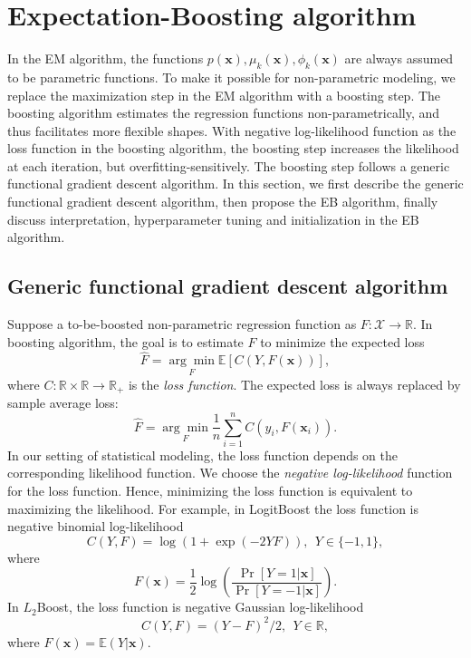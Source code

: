 \documentclass[11pt]{article}
\numberwithin{equation}{section}
\def\R{{\mathbb R}}  %
\def\E{{\mathbb E}}  %
\def\bx{\boldsymbol{x}}
\begin{document}
\section{Expectation-Boosting algorithm}\label{sec:EB}
In the EM algorithm, the functions $p(\bx), \mu_k(\bx), \phi_k(\bx)$ are always assumed to be parametric functions.
To make it possible for non-parametric modeling, we replace the maximization step in the EM algorithm with a boosting step.
The boosting algorithm estimates the regression functions non-parametrically, and thus facilitates more flexible shapes.
With negative log-likelihood function as the loss function in the boosting algorithm, 
the boosting step increases the likelihood at each iteration, but overfitting-sensitively.
The boosting step follows a generic functional gradient descent algorithm. In this section, we first describe the generic functional gradient descent algorithm, then propose the EB algorithm, finally discuss interpretation, hyperparameter tuning and initialization in the EB algorithm.

\subsection{Generic functional gradient descent algorithm}
Suppose a to-be-boosted {non-parametric regression function} as $F:\mathcal{X}\rightarrow\R$. In boosting algorithm, the goal is to  estimate $F$ to minimize the expected loss $$\hat{F}=\underset{F}{\arg\min}\E\left[C(Y,F(\bx))\right],$$
	where $C:\R\times\R\rightarrow\R_+$ is the \textit{loss function}.
	The expected loss is always replaced by sample average loss:
	$$\hat{F}=\underset{F}{\arg\min}\frac{1}{n}\sum_{i=1}^nC(y_i,F(\bx_i)).$$
	In our setting of statistical modeling, the loss function depends on the corresponding likelihood function.
	We choose the \textit{negative log-likelihood} function for the loss function. Hence, minimizing the loss function is equivalent to maximizing the likelihood.
For example, in LogitBoost the loss function is negative binomial log-likelihood
$$C(Y,F)=\log(1+\exp(-2YF)), ~~ Y\in\{-1,1\},$$
where 
\begin{equation}\label{logit-link}
F(\bx)=\frac{1}{2}\log\left(\frac{\Pr[Y=1|\bx]}{\Pr[Y=-1|\bx]}\right).
\end{equation}
In $L_2$Boost, the loss function is negative Gaussian log-likelihood
\begin{equation}\label{l2}
	C(Y,F)=(Y-F)^2/2, ~~ Y\in \R,
\end{equation}
where $F(\bx)=\E(Y|\bx).$
\end{document}
